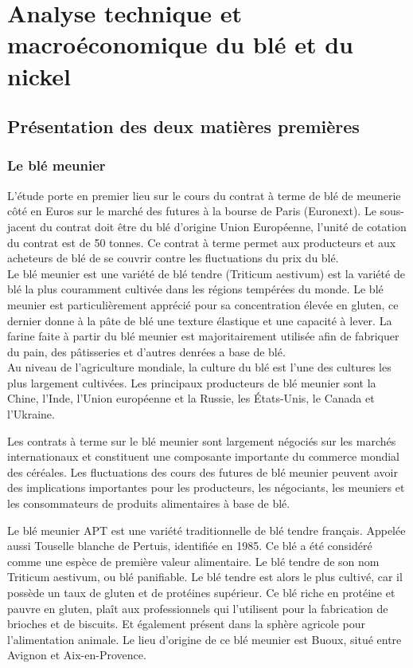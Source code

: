 \section{Analyse technique et macroéconomique du blé et du nickel}
\subsection{Présentation des deux matières premières}
\subsubsection{Le blé meunier}
L'étude porte en premier lieu sur le cours du contrat à terme de blé de meunerie côté en Euros sur le marché des futures à la bourse
de Paris (Euronext). Le sous-jacent du contrat doit être du blé d'origine Union Européenne, l'unité de cotation du contrat est de 50
tonnes. Ce contrat à terme permet aux producteurs et aux acheteurs de blé de se couvrir contre les fluctuations du prix du blé.\\[11pt]
Le blé meunier est une variété de blé tendre (Triticum aestivum) est la variété de blé la plus couramment cultivée dans les régions 
tempérées du monde. Le blé meunier est particulièrement apprécié pour sa concentration élevée en gluten, ce dernier donne à
la pâte de blé une texture élastique et une capacité à lever. La farine faite à partir du blé meunier est majoritairement 
utilisée afin de fabriquer du pain, des pâtisseries et d'autres denrées a base de blé.\\[11pt]
Au niveau de l'agriculture mondiale, la culture du blé est l'une des cultures les plus largement cultivées.
Les principaux producteurs de blé meunier sont la Chine, l'Inde, l'Union européenne et la Russie, les États-Unis, le Canada
et l'Ukraine.

Les contrats à terme sur le blé meunier sont largement négociés sur les marchés internationaux et constituent une composante
importante du commerce mondial des céréales. Les fluctuations des cours des futures de blé meunier peuvent avoir des implications
importantes pour les producteurs, les négociants, les meuniers et les consommateurs de produits alimentaires à base de blé.



Le blé meunier APT est une variété traditionnelle de blé tendre français. Appelée aussi Touselle blanche de Pertuis, 
identifiée en 1985. Ce blé a été considéré comme une espèce de première valeur alimentaire. Le blé tendre de son nom 
Triticum aestivum, ou blé panifiable. Le blé tendre est alors le plus cultivé, car il possède un taux de gluten et de 
protéines supérieur. Ce blé riche en protéine et pauvre en gluten, plaît aux professionnels qui l'utilisent pour la 
fabrication de brioches et de biscuits.  Et également présent dans la sphère agricole pour l’alimentation animale.
Le lieu d’origine de ce blé meunier est  Buoux, situé  entre Avignon et Aix-en-Provence. 

